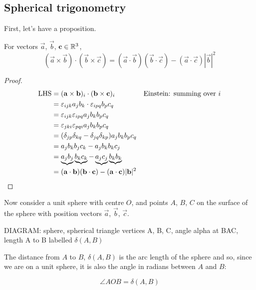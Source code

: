 \documentclass{../template/note}
\begin{document}

    \subsection{Spherical trigonometry}

    First, let's have a proposition.

    \begin{proposition}
        For vectors \(\vec a\), \(\vec b\), \(\vec c \in \RR^3\),
        \[
            (\vec a \times \vec b) \cdot (\vec b \times \vec c) = (\vec a \cdot \vec b)(\vec b \cdot \vec c) - (\vec a \cdot \vec c)|\vec b|^2
        \]
        \label{dot-of-crosses-identity}
    \end{proposition}
    
    \begin{proof}
        \begin{align*}
            \mathrm{LHS} &= (\vec a \times \vec b)_i \cdot (\vec b \times \vec c)_i && \text{Einstein: summing over } i\\
            &= \lv{ijk}a_jb_k \cdot \lv{ipq}b_pc_q \\
            &= \lv{ijk}\lv{ipq}a_jb_kb_pc_q \\
            &= \lv{jki}\lv{pqi}a_jb_kb_pc_q \\
            &= (\delta_{jp}\delta_{kq} - \delta_{jq}\delta_{kp})a_jb_kb_pc_q \\
            &= a_jb_kb_jc_k - a_jb_kb_kc_j \\
            &= \underbrace{a_jb_j} \underbrace{b_kc_k} - \underbrace{a_jc_j} \underbrace{b_kb_k} \\
            &= (\vec a \cdot \vec b)(\vec b \cdot \vec c) - (\vec a \cdot \vec c) |\vec b|^2
        \end{align*}        
    \end{proof}
    
    Now consider a unit sphere with centre \(O\), and points \(A\), \(B\), \(C\) on the surface of the sphere with position vectors \(\vec a\), \(\vec b\), \(\vec c\).

    DIAGRAM: sphere, spherical triangle vertices A, B, C, angle alpha at BAC, length A to B labelled \(\delta(A, B)\)

    The distance from \(A\) to \(B\), \(\delta(A, B)\) is the arc length of the sphere and so, since we are on a unit sphere, it is also the angle in radians between \(A\) and \(B\):

    \[
        \angle AOB = \delta(A, B)
    \]
\end{document}
